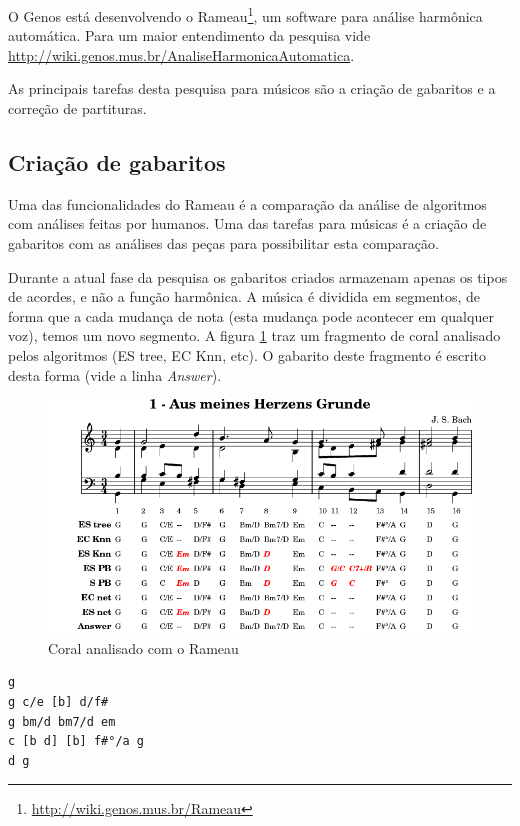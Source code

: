 \documentclass[12pt,brazil]{book}
\newcommand{\eng}[1]{\textit{#1}}
\begin{document}
O Genos está desenvolvendo o
Rameau\footnote{\url{http://wiki.genos.mus.br/Rameau}}, um software
para análise harmônica automática. Para um maior entendimento da
pesquisa vide
\url{http://wiki.genos.mus.br/AnaliseHarmonicaAutomatica}.

As principais tarefas desta pesquisa para músicos são a criação de
gabaritos e a correção de partituras.

\subsection{Criação de gabaritos}
\label{sec:criacao-de-gabaritos}

Uma das funcionalidades do Rameau é a comparação da análise de
algoritmos com análises feitas por humanos. Uma das tarefas para
músicas é a criação de gabaritos com as análises das peças para
possibilitar esta comparação.

Durante a atual fase da pesquisa os gabaritos criados armazenam apenas
os tipos de acordes, e não a função harmônica. A música é dividida em
segmentos, de forma que a cada mudança de nota (esta mudança pode
acontecer em qualquer voz), temos um novo segmento. A figura
\ref{fig:choral-rameau} traz um fragmento de coral analisado pelos
algoritmos (ES tree, EC Knn, etc). O gabarito deste fragmento é
escrito desta forma (vide a linha \eng{Answer}).

\begin{figure}
  \centering
  \includegraphics[scale=.8]{analysis-001}
  \caption{Coral analisado com o Rameau}
  \label{fig:choral-rameau}
\end{figure}

\begin{verbatim}
g
g c/e [b] d/f#
g bm/d bm7/d em
c [b d] [b] f#°/a g
d g
\end{verbatim}
\end{document}
